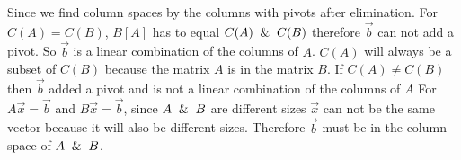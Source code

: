 Since we find column spaces by the columns with pivots after elimination.
		For
		\newline
		$C(A)=C(B)$, $B[A]$ has to equal $C(A) \And C(B)$ therefore $\vec{b}$ can not add a pivot. So $\vec{b}$ is a linear combination of the columns of $A$.
		\newline
		\newline
		$C(A)$ will always be a subset of $C(B)$ because the matrix $A$ is in the matrix $B$.
		\newline
		\newline
		If $C(A) \neq C(B)$ then $\vec{b}$ added a pivot and is not a linear combination of the columns of $A$
		\newline
		\newline
		For $A\vec{x}=\vec{b}$ and $B\vec{x}=\vec{b}$, since $A \And B$ are different sizes $\vec{x}$ can not be the same vector because it will also be different sizes.  Therefore $\vec{b}$ must be in the column space of $A \And B$.